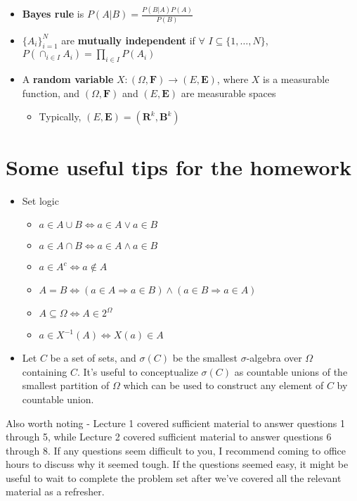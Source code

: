 \documentclass[12pt,english]{article}
\begin{document}
\begin{itemize}
	\item \textbf{Bayes rule} is $P(A | B) = \frac{P(B | A) P(A)}{P(B)}$
	\item $\{ A_{i} \}_{i = 1}^{N}$ are \textbf{mutually independent} if $\forall$ $I \subseteq \{1, \ldots, N\}$, $P(\cap_{i \in I} A_{i}) = \prod_{i \in I} P(A_{i})$
	\item A \textbf{random variable} $X : (\Omega, \mathbf{F}) \to (E, \mathbf{E})$, where $X$ is a measurable function, and $(\Omega, \mathbf{F})$ and $(E, \mathbf{E})$ are measurable spaces
	\begin{itemize}
		\item Typically, $(E, \mathbf{E}) = (\mathbf{R}^{k}, \mathbf{B}^{k})$
	\end{itemize}
\end{itemize}

\section{Some useful tips for the homework}

\begin{itemize}
	\item Set logic
	\begin{itemize}
		\item $a \in A \cup B \Leftrightarrow a \in A \vee a \in B$
		\item $a \in A \cap B \Leftrightarrow a \in A \wedge a \in B$
		\item $a \in A^{c} \Leftrightarrow a \notin A$
		\item $A = B \Leftrightarrow (a \in A \Rightarrow a \in B) \wedge (a \in B \Rightarrow a \in A)$
		\item $A \subseteq \Omega \Leftrightarrow A \in 2^{\Omega}$
		\item $a \in X^{-1}(A) \Leftrightarrow X(a) \in A$
	\end{itemize}
	\item Let $C$ be a set of sets, and $\sigma(C)$ be the smallest $\sigma$-algebra over $\Omega$ containing $C$. It's useful to conceptualize $\sigma(C)$ as countable unions of the smallest partition of $\Omega$ which can be used to construct any element of $C$ by countable union.
\end{itemize}

\vspace{1em}
Also worth noting - Lecture 1 covered sufficient material to answer questions 1 through 5, while Lecture 2 covered sufficient material to answer questions 6 through 8. If any questions seem difficult to you, I recommend coming to office hours to discuss why it seemed tough. If the questions seemed easy, it might be useful to wait to complete the problem set after we've covered all the relevant material as a refresher.
\end{document}
